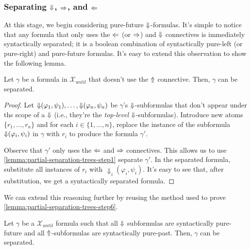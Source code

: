 \documentclass[a4paper,UKenglish,cleveref, autoref, thm-restate, numberwithinsect]{lipics-v2021}
\def\Larrow{\ensuremath\mathord{\Leftarrow}}
\def\Rarrow{\ensuremath\mathord{\Rightarrow}}
\def\Uarrow{\ensuremath\mathord{\Uparrow}}
\def\Darrow{\ensuremath\mathord{\Downarrow}}
\begin{document}
\subsubsection{Separating $\Darrow$, $\Rarrow$, and $\Larrow$}
At this stage, we begin considering pure-future $\Darrow$-formulas. It's simple to notice that any formula that only uses the $\Larrow$ (or $\Rarrow$) and $\Darrow$ connectives is immediately syntactically separated; it is a boolean combination of syntactically pure-left (or pure-right) and pure-future formulas. It's easy to extend this observation to show the following lemma.
\begin{lemma}
    \label{lemma:partial-separation-trees-step7}
    Let $\gamma$ be a formula in $\mathcal{X}_{until}$ that doesn't use the $\Uarrow$ connective. Then, $\gamma$ can be separated.
\end{lemma}
\begin{proof}
    Let $\Darrow(\varphi_1, \psi_1), \ldots, \Darrow(\varphi_n, \psi_n)$ be $\gamma$'s $\Darrow$-subformulas that don't appear under ths scope of a $\Darrow$ (i.e., they're the \textit{top-level} $\Darrow$-subformulas). Introduce new atoms $\{r_1, \ldots, r_n\}$ and for each $i \in \{1, \ldots, n\}$, replace the instance of the subformula $\Darrow(\varphi_i, \psi_i)$ in $\gamma$ with $r_i$ to produce the formula $\gamma'$.

    Observe that $\gamma'$ only uses the $\Larrow$ and $\Rarrow$ connectives. This allows us to use \cref{lemma:partial-separation-trees-step1} separate $\gamma'$. In the separated formula, substitute all instances of $r_i$ with $\Downarrow_i(\varphi_i, \psi_i)$. It's easy to see that, after substitution, we get a syntactically separated formula.
\end{proof}
We can extend this reasoning further by reusing the method used to prove \cref{lemma:partial-separation-trees-step6}.
\begin{corollary}
    \label{lemma:partial-separation-trees-step8}
    Let $\gamma$ be a $\mathcal{X}_{until}$ formula such that all $\Darrow$ subformulas are syntactically pure-future and all $\Uarrow$-subformulas are syntactically pure-past. Then, $\gamma$ can be separated.
\end{corollary}
\end{document}
